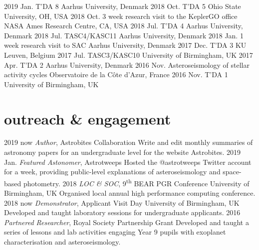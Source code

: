 \documentclass[]{k-cv} %
\begin{document}
\begin{entrylist}
\entrythree
{2019 Jan.}
{T'DA 8}
{Aarhus University, Denmark}
\entrythree
{2018 Oct.}
{T'DA 5}
{Ohio State University, OH, USA}
\entrythree
{2018 Oct.}
{3 week research visit to the KeplerGO office}
{NASA Ames Research Centre, CA, USA}
\entrythree
{2018 Jul.}
{T'DA 4}
{Aarhus University, Denmark}
\entrythree
{2018 Jul.}
{TASC4/KASC11}
{Aarhus University, Denmark}
\entrythree
{2018 Jan.}
{1 week research visit to SAC}
{Aarhus University, Denmark}
\entrythree
{2017 Dec.}
{T'DA 3}
{KU Leuven, Belgium}
\entrythree
{2017 Jul.}
{TASC3/KASC10}
{University of Birmingham, UK}
\entrythree
{2017 Apr.}
{T'DA 2}
{Aarhus University, Denmark}
\entrythree
{2016 Nov.}
{Asteroseismology of stellar activity cycles}
{Observatoire de la C\^{o}te d'Azur, France}
\entrythree
{2016 Nov.}
{T'DA 1}
{University of Birmingham, UK}
\end{entrylist}

\section{outreach \& engagement}

\begin{entrylist}
\entry
{2019 \to now}
{\emph{Author}, Astrobites Collaboration}
{}
{Write and edit monthly summaries of astronomy papers for an undergraduate level for the website Astrobites.}
\entry
{2019 Jan.}
{\emph{Featured Astonomer}, Astrotweeps}
{}
{Hosted the @astrotweeps Twitter account for a week, providing public-level explanations of asteroseismology and space-based photometry.}
\entry
{2018 }
{\emph{LOC \& SOC}, 9\textsuperscript{th} BEAR PGR Conference}
{University of Birmingham, UK}
{Organised local annual high performance computing conference.}
\entry
{2018 \to now}
{\emph{Demonstrator}, Applicant Visit Day}
{University of Birmingham, UK}
{Developed and taught laboratory sessions for undergraduate applicants.}
\entry
{2016 }
{\emph{Partnered Researcher}, Royal Society Partnership Grant}
{}
{Developed and taught a series of lessons and lab activities engaging Year 9 pupils with exoplanet characterisation and asteroseismology.}
\end{entrylist}
\end{document}
